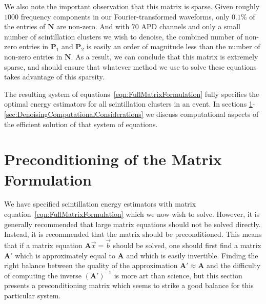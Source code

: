 We also note the important observation that this matrix is sparse.  Given roughly $1000$ frequency components in our Fourier-transformed waveforms, only $0.1\%$ of the entries of $\mathbf{N}$ are non-zero.  And with $70$ APD channels and only a small number of scintillation clusters we wish to denoise, the combined number of non-zero entries in $\mathbf{P}_1$ and $\mathbf{P}_2$ is easily an order of magnitude less than the number of non-zero entries in $\mathbf{N}$.  As a result, we can conclude that this matrix is extremely sparse, and should ensure that whatever method we use to solve these equations takes advantage of this sparsity.

The resulting system of equations~\ref{eqn:FullMatrixFormulation} fully specifies the optimal energy estimators for all scintillation clusters in an event.  In sections \ref{sec:Preconditioning}-\ref{sec:DenoisingComputationalConsiderations} we discuss computational aspects of the efficient solution of that system of equations.

\section{Preconditioning of the Matrix Formulation}\label{sec:Preconditioning}

We have specified scintillation energy estimators with matrix equation~\ref{eqn:FullMatrixFormulation} which we now wish to solve.  However, it is generally recommended that large matrix equations should not be solved directly.  Instead, it is recommended that the matrix should be preconditioned.  This means that if a matrix equation $\mathbf{A}\vec{x} = \vec{b}$ should be solved, one should first find a matrix $\mathbf{A}'$ which is approximately equal to $\mathbf{A}$ and which is easily invertible.  Finding the right balance between the quality of the approximation $\mathbf{A}' \approx \mathbf{A}$ and the difficulty of computing the inverse $\left(\mathbf{A}'\right)^{-1}$ is more art than science, but this section presents a preconditioning matrix which seems to strike a good balance for this particular system.

